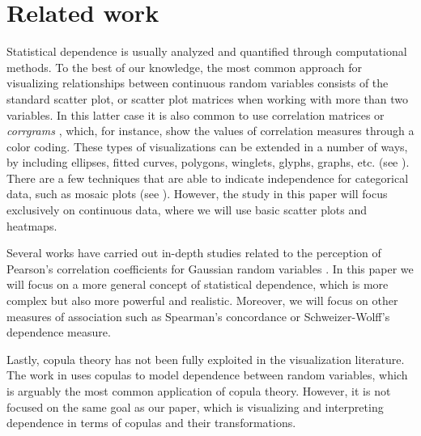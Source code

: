 \documentclass[journal]{vgtc}                %
\begin{document}
\section{Related work}
\label{sec:relatedwork}


Statistical dependence is usually analyzed and quantified through computational methods. To the best of our knowledge, the most common approach for visualizing relationships between continuous random variables consists of the standard scatter plot, or scatter plot matrices when working with more than two variables. In this latter case it is also common to use correlation matrices or \textit{corrgrams} \cite{Friendly02}, which, for instance, show the values of correlation measures through a color coding. These types of visualizations can be extended in a number of ways, by including ellipses, fitted curves, polygons, winglets, glyphs, graphs, etc. (see \cite{Friendly06,Elmqvist08b,Chan13,Yates14,Nguyen16,Nguyen17,Lu20}). There are a few techniques that are able to indicate independence for categorical data, such as mosaic plots (see \cite{Friendly01}). However, the study in this paper will focus exclusively on continuous data, where we will use basic scatter plots and heatmaps. 


Several works have carried out in-depth studies related to the perception of Pearson's correlation coefficients for Gaussian random variables \cite{Doherty2007,Rensik2010,Harrison2014,Sher2017}. In this paper we will focus on a more general concept of statistical dependence, which is more complex but also more powerful and realistic. Moreover, we will focus on other measures of association such as Spearman's concordance or Schweizer-Wolff's dependence measure.


Lastly, copula theory has not been fully exploited in the visualization literature. The work in \cite{Hazarika18} uses copulas to model dependence between random variables, which is arguably the most common application of copula theory. However, it is not focused on the same goal as our paper, which is visualizing and interpreting dependence in terms of copulas and their transformations.




\end{document}
